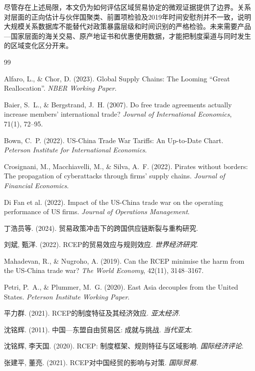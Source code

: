 \documentclass[12pt,a4paper]{ctexart}
\begin{document}
尽管存在上述局限，本文仍为如何评估区域贸易协定的微观证据提供了边界。关系对层面的正向估计与伙伴国聚类、前置项检验及2019年时间安慰剂并不一致，说明大规模关系数据库不能替代对政策暴露层级和时间识别的严格检验。未来需要产品—国家层面的海关交易、原产地证书和优惠使用数据，才能把制度渠道与同时发生的区域变化区分开来。


\begin{thebibliography}{99}

Alfaro, L., \& Chor, D. (2023).
\newblock Global Supply Chains: The Looming ``Great Reallocation''.
\newblock \textit{NBER Working Paper}.

Baier, S.~L., \& Bergstrand, J.~H. (2007).
\newblock Do free trade agreements actually increase members' international trade?
\newblock \textit{Journal of International Economics}, 71(1), 72--95.

Bown, C.~P. (2022).
\newblock US-China Trade War Tariffs: An Up-to-Date Chart.
\newblock \textit{Peterson Institute for International Economics}.

Crosignani, M., Macchiavelli, M., \& Silva, A.~F. (2022).
\newblock Pirates without borders: The propagation of cyberattacks through firms' supply chains.
\newblock \textit{Journal of Financial Economics}.

Di Fan et al. (2022).
\newblock Impact of the US-China trade war on the operating performance of US firms.
\newblock \textit{Journal of Operations Management}.

丁浩员等. (2024).
\newblock 贸易政策冲击下的跨国供应链断裂与重构研究.

刘斌, 甄洋. (2022).
\newblock RCEP的贸易效应与规则效应.
\newblock \textit{世界经济研究}.

Mahadevan, R., \& Nugroho, A. (2019).
\newblock Can the RCEP minimise the harm from the US-China trade war?
\newblock \textit{The World Economy}, 42(11), 3148--3167.

Petri, P.~A., \& Plummer, M.~G. (2020).
\newblock East Asia decouples from the United States.
\newblock \textit{Peterson Institute Working Paper}.

平力群. (2021).
\newblock RCEP的制度特征及其经济效应.
\newblock \textit{亚太经济}.

沈铭辉. (2011).
\newblock 中国—东盟自由贸易区: 成就与挑战.
\newblock \textit{当代亚太}.

沈铭辉, 李天国. (2020).
\newblock RCEP: 制度框架、规则特征与区域影响.
\newblock \textit{国际经济评论}.

张建平, 董亮. (2021).
\newblock RCEP对中国经贸的影响与对策.
\newblock \textit{国际贸易}.

\end{thebibliography}
\end{document}
